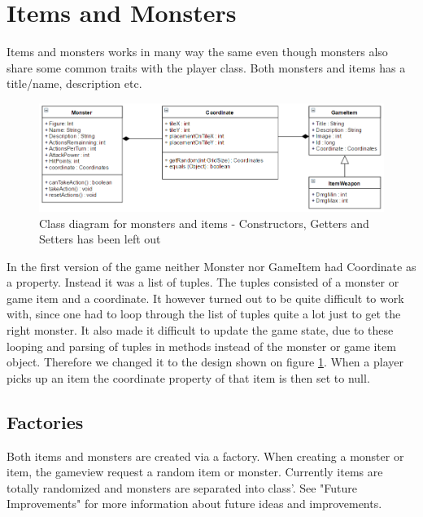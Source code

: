 \section{Items and Monsters}

Items and monsters works in many way the same even though monsters also share some common traits with the player class.
Both monsters and items has a title/name, description etc.

\begin{figure}[ht!]
	\centering
	\includegraphics[width=130mm]{images/itemsAndMonstersDiagram.png}
	\caption{Class diagram for monsters and items - Constructors, Getters and Setters has been left out}
	\label{fig:itemsAndMonstersDiagram}
\end{figure}

In the first version of the game neither Monster nor GameItem had Coordinate as a property. Instead it was a list of tuples. The tuples consisted of a monster or game item and a coordinate. It however turned out to be quite difficult to work with, since one had to loop through the list of tuples quite a lot just to get the right monster. It also made it difficult to update the game state, due to these looping and parsing of tuples in methods instead of the monster or game item object. Therefore we changed it to the design shown on figure \ref{fig:itemsAndMonstersDiagram}. When a player picks up an item the coordinate property of that item is then set to null. \\

\subsection{Factories}
Both items and monsters are created via a factory. When creating a monster or item, the gameview request a random item or monster. Currently items are totally randomized and monsters are separated into class'. See "Future Improvements" for more information about future ideas and improvements.
